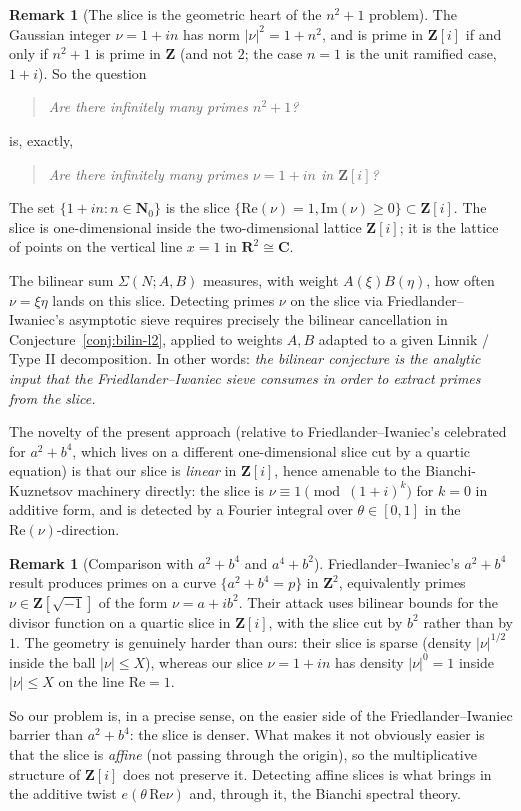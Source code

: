 \documentclass[11pt]{article}
\theoremstyle{definition}
\newtheorem{remark}[theorem]{Remark}
\newcommand{\Nz}{\mathbf{N}_0}
\newcommand{\Z}{\mathbf{Z}}
\newcommand{\R}{\mathbf{R}}
\newcommand{\C}{\mathbf{C}}
\newcommand{\Zi}{\Z[i]}
\renewcommand{\Re}{\mathrm{Re}}
\renewcommand{\Im}{\mathrm{Im}}
\begin{document}
\begin{remark}[The slice is the geometric heart of the $n^2+1$ problem]\label{rmk:slice-justification}
The Gaussian integer $\nu=1+in$ has norm $|\nu|^2=1+n^2$, and is prime in $\Zi$ if and only if $n^2+1$ is prime in $\Z$ (and not $2$; the case $n=1$ is the unit ramified case, $1+i$). So the question
\begin{quote}
\emph{Are there infinitely many primes $n^2+1$?}
\end{quote}
is, exactly,
\begin{quote}
\emph{Are there infinitely many primes $\nu=1+in$ in $\Zi$?}
\end{quote}
The set $\{1+in:n\in\Nz\}$ is the slice $\{\Re(\nu)=1,\Im(\nu)\ge 0\}\subset\Zi$. The slice is one-dimensional inside the two-dimensional lattice $\Zi$; it is the lattice of points on the vertical line $x=1$ in $\R^2\cong\C$.

The bilinear sum $\Sigma(N;A,B)$ measures, with weight $A(\xi)B(\eta)$, how often $\nu=\xi\eta$ lands on this slice. Detecting primes $\nu$ on the slice via Friedlander--Iwaniec's asymptotic sieve requires precisely the bilinear cancellation in Conjecture~\ref{conj:bilin-l2}, applied to weights $A,B$ adapted to a given Linnik / Type II decomposition. In other words: \emph{the bilinear conjecture is the analytic input that the Friedlander--Iwaniec sieve consumes in order to extract primes from the slice.}

The novelty of the present approach (relative to Friedlander--Iwaniec's celebrated \cite{FI98b} for $a^2+b^4$, which lives on a different one-dimensional slice cut by a quartic equation) is that our slice is \emph{linear} in $\Zi$, hence amenable to the Bianchi-Kuznetsov machinery directly: the slice is $\nu\equiv 1\pmod{(1+i)^k}$ for $k=0$ in additive form, and is detected by a Fourier integral over $\theta\in[0,1]$ in the $\Re(\nu)$-direction.
\end{remark}

\begin{remark}[Comparison with $a^2+b^4$ and $a^4+b^2$]\label{rmk:fi-comparison}
Friedlander--Iwaniec's $a^2+b^4$ result \cite{FI98b} produces primes on a curve $\{a^2+b^4=p\}$ in $\Z^2$, equivalently primes $\nu\in\Z[\sqrt{-1}]$ of the form $\nu=a+ib^2$. Their attack uses bilinear bounds for the divisor function on a quartic slice in $\Zi$, with the slice cut by $b^2$ rather than by $1$. The geometry is genuinely harder than ours: their slice is sparse (density $|\nu|^{1/2}$ inside the ball $|\nu|\le X$), whereas our slice $\nu=1+in$ has density $|\nu|^0=1$ inside $|\nu|\le X$ on the line $\Re=1$.

So our problem is, in a precise sense, on the easier side of the Friedlander--Iwaniec barrier than $a^2+b^4$: the slice is denser. What makes it not obviously easier is that the slice is \emph{affine} (not passing through the origin), so the multiplicative structure of $\Zi$ does not preserve it. Detecting affine slices is what brings in the additive twist $e(\theta\,\Re\nu)$ and, through it, the Bianchi spectral theory.
\end{remark}
\end{document}
